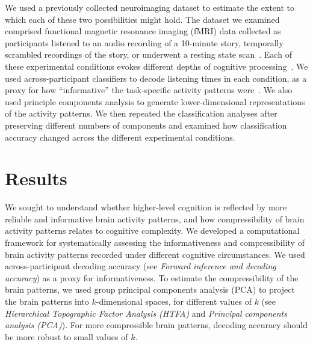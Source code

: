\documentclass[english, 11pt]{article}
\begin{document}
We used a previously collected neuroimaging dataset to estimate the extent to
which each of these two possibilities might hold. The dataset we examined
comprised functional magnetic resonance imaging (fMRI) data collected as
participants listened to an audio recording of a 10-minute story, temporally
scrambled recordings of the story, or underwent a resting state
scan~\citep{SimoEtal16}. Each of these experimental conditions evokes different
depths of cognitive processing~\citep{SimoEtal16,LernEtal11,
HassEtal08,OwenEtal21}. We used across-participant classifiers to decode
listening times in each condition, as a proxy for how ``informative'' the
task-specific activity patterns were~\citep{SimoChan20}. We also used principle
components analysis to generate lower-dimensional representations of the
activity patterns. We then repeated the classification analyses after
preserving different numbers of components and examined how classification
accuracy changed across the different experimental conditions.



\section*{Results}

We sought to understand whether higher-level cognition is reflected by more
reliable and informative brain activity patterns, and how compressibility of
brain activity patterns relates to cognitive complexity. We developed a
computational framework for systematically assessing the informativeness and
compressibility of brain activity patterns recorded under different cognitive
circumstances. We used across-participant decoding accuracy (see
\textit{Forward inference and decoding accuracy}) as a proxy for
informativeness. To estimate the compressibility of the brain patterns, we used
group principal components analysis (PCA) to project the brain patterns into
$k$-dimensional spaces, for different values of $k$ (see \textit{Hierarchical
Topographic Factor Analysis (HTFA)} and \textit{Principal components analysis
(PCA)}). For more compressible brain patterns, decoding accuracy should be more
robust to small values of $k$.
\end{document}
